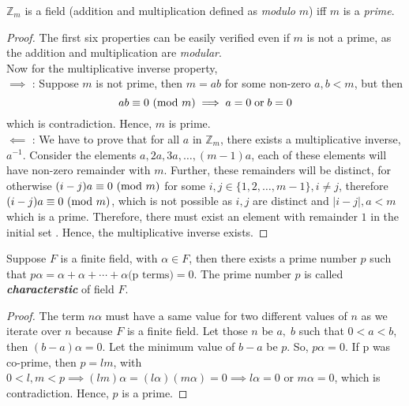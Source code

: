 \documentclass[../main.tex]{subfiles}
\begin{document}
	\begin{thm}\label{thm_Zm_field}
	$\mathbb{Z}_m$ is a field (addition and multiplication defined as \emph{modulo} $m$) iff $m$ is a \emph{prime}.
	\end{thm}
	\begin{proof}
		The first six properties can be easily verified even if $m$ is not a prime, as the addition and multiplication are \emph{modular}.\\
		Now for the multiplicative inverse property,\\
		$\implies$ : Suppose $m$ is not prime, then $m=ab$ for some non-zero $a,b<m$, 
		but then 
		\[
			ab\equiv 0\ (\mathrm{mod}\ m) \implies a=0\;\text{or}\;b=0	
		\] which is contradiction. Hence, $m$ is prime.\\
		$\impliedby$ : We have to prove that for all $a$ in $\mathbb{Z}_m$, there exists a multiplicative inverse, $a^{-1}$. Consider the elements $a, 2a, 3a,\ldots, (m-1)a$, each of these elements will have non-zero remainder with $m$. Further, these remainders will be distinct, for otherwise $(i-j)a\equiv 0\ (\mathrm{mod}\ m)$ for some $i,j \in \{1,2,\ldots,m-1\}, i\neq j$, therefore $(i-j)a\equiv 0\ (\mathrm{mod}\ m)$, which is not possible as $i,j$ are distinct and $|i-j|,a < m$ which is a prime. Therefore, there must exist an element with remainder $1$ in the initial set	. Hence, the multiplicative inverse exists. 
	\end{proof}
	\begin{thm}
	Suppose $F$ is a finite field, with $\alpha \in F$, then there exists a prime number $p$ such that $p\alpha = \alpha+\alpha+\cdots +\alpha\text{(p terms)} = 0$. The prime number $p$ is called \textbf{\emph{characterstic}} of field $F$.
	\end{thm}
	\begin{proof}
		The term $n\alpha$ must have a same value for two different values of $n$ as we iterate over $n$ because $F$ is a finite field. Let those $n$ be $a,\;b$ such that $0<a<b$, then $(b-a)\alpha = 0$. Let the minimum value of $b-a$ be $p$. So, $p\alpha = 0$. If p was co-prime, then $p=lm$, with $0<l,m<p \implies (lm)\alpha=(l\alpha)(m\alpha)=0 \implies l\alpha=0 $ or $m\alpha=0$, which is contradiction. Hence, $p$ is a prime. 
	\end{proof}
				
\end{document}
